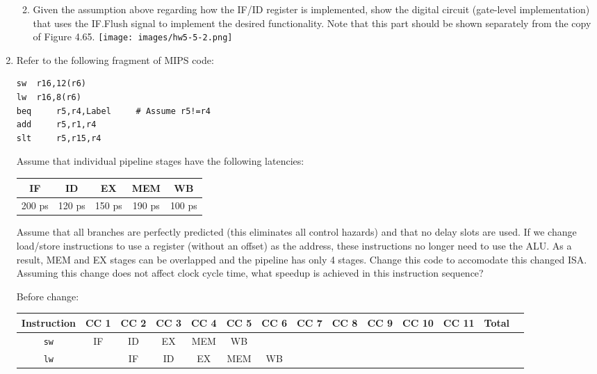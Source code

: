 \documentclass[10pt,letterpaper]{article}
\begin{document}
\begin{enumerate}[label=\textbf{Problem \arabic*.}]
\begin{enumerate}[label=\Alph*)]
	\begin{center}
	\end{center}
	\item Given the assumption above regarding how the IF/ID register is implemented, show the digital circuit (gate-level implementation) that uses the IF.Flush signal to implement the desired functionality. Note that this part should be shown separately from the copy of Figure 4.65.
	\hspace*{-1.5cm}\texttt{[image: images/hw5-5-2.png]}
	\end{enumerate}
\item Refer to the following fragment of MIPS code:
\begin{lstlisting}
sw 	r16,12(r6)
lw 	r16,8(r6)
beq 	r5,r4,Label 	# Assume r5!=r4
add 	r5,r1,r4
slt 	r5,r15,r4
\end{lstlisting}
Assume that individual pipeline stages have the following latencies:
\begin{center}\begin{tabular} { |c|c|c|c|c| }
\hline
IF & ID & EX & MEM & WB \\
\hline
200 ps & 120 ps & 150 ps & 190 ps & 100 ps \\
\hline
\end{tabular}\end{center}
Assume that all branches are perfectly predicted (this eliminates all control hazards) and that no delay slots are used. If we change load/store instructions to use a register (without an offset) as the address, these instructions no longer need to use the ALU. As a result, MEM and EX stages can be overlapped and the pipeline has only 4 stages. Change this code to accomodate this changed ISA. Assuming this change does not affect clock cycle time, what speedup is achieved in this instruction sequence?
\pagebreak
\begin{center}
Before change:\\
\hspace*{-1.5cm}\begin{tabular}[width=\pagewidth] { |c|c|c|c|c|c|c|c|c|c|c|c|c|c| }
\hline
Instruction & CC 1 & CC 2 & CC 3 & CC 4 & CC 5 & CC 6 & CC 7 & CC 8 & CC 9 & CC 10 & CC 11 & Total\\
\hline
\texttt{sw} & \cellcolor{blue!25}IF & ID & EX & \cellcolor{blue!25}MEM & WB & & & & & & & \\
\hline
\texttt{lw} & & \cellcolor{blue!25}IF & ID & EX & \cellcolor{blue!25}MEM & WB & & & & & & \\

\end{tabular}
\end{center}
\end{enumerate}
\end{document}
